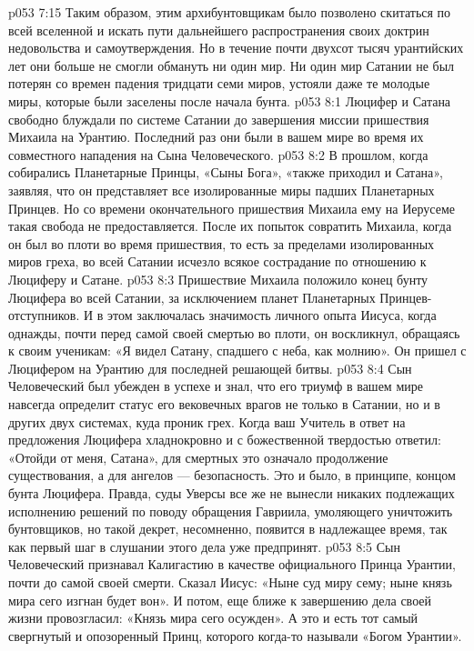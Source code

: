 \vs p053 7:15 Таким образом, этим архибунтовщикам было позволено скитаться по всей вселенной и искать пути дальнейшего распространения своих доктрин недовольства и самоутверждения. Но в течение почти двухсот тысяч урантийских лет они больше не смогли обмануть ни один мир. Ни один мир Сатании не был потерян со времен падения тридцати семи миров, устояли даже те молодые миры, которые были заселены после начала бунта.
\vs p053 8:1 Люцифер и Сатана свободно блуждали по системе Сатании до завершения миссии пришествия Михаила на Урантию. Последний раз они были в вашем мире во время их совместного нападения на Сына Человеческого.
\vs p053 8:2 В прошлом, когда собирались Планетарные Принцы, «Сыны Бога», «также приходил и Сатана», заявляя, что он представляет все изолированные миры падших Планетарных Принцев. Но со времени окончательного пришествия Михаила ему на Иерусеме такая свобода не предоставляется. После их попыток совратить Михаила, когда он был во плоти во время пришествия, то есть за пределами изолированных миров греха, во всей Сатании исчезло всякое сострадание по отношению к Люциферу и Сатане.
\vs p053 8:3 \pc Пришествие Михаила положило конец бунту Люцифера во всей Сатании, за исключением планет Планетарных Принцев\hyp{}отступников. И в этом заключалась значимость личного опыта Иисуса, когда однажды, почти перед самой своей смертью во плоти, он воскликнул, обращаясь к своим ученикам: «Я видел Сатану, спадшего с неба, как молнию». Он пришел с Люцифером на Урантию для последней решающей битвы.
\vs p053 8:4 Сын Человеческий был убежден в успехе и знал, что его триумф в вашем мире навсегда определит статус его вековечных врагов не только в Сатании, но и в других двух системах, куда проник грех. Когда ваш Учитель в ответ на предложения Люцифера хладнокровно и с божественной твердостью ответил: «Отойди от меня, Сатана», для смертных это означало продолжение существования, а для ангелов --- безопасность. Это и было, в принципе, концом бунта Люцифера. Правда, суды Уверсы все же не вынесли никаких подлежащих исполнению решений по поводу обращения Гавриила, умоляющего уничтожить бунтовщиков, но такой декрет, несомненно, появится в надлежащее время, так как первый шаг в слушании этого дела уже предпринят.
\vs p053 8:5 Сын Человеческий признавал Калигастию в качестве официального Принца Урантии, почти до самой своей смерти. Сказал Иисус: «Ныне суд миру сему; ныне князь мира сего изгнан будет вон». И потом, еще ближе к завершению дела своей жизни провозгласил: «Князь мира сего осужден». А это и есть тот самый свергнутый и опозоренный Принц, которого когда\hyp{}то называли «Богом Урантии».
